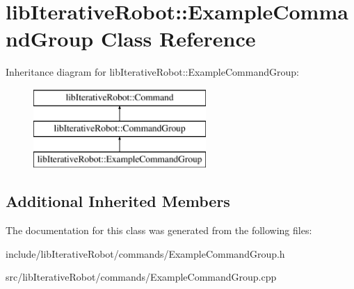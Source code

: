 \hypertarget{classlib_iterative_robot_1_1_example_command_group}{}\section{lib\+Iterative\+Robot\+::Example\+Command\+Group Class Reference}
\label{classlib_iterative_robot_1_1_example_command_group}
Inheritance diagram for lib\+Iterative\+Robot\+::Example\+Command\+Group\+:\begin{figure}[H]
\begin{center}
\leavevmode
\includegraphics[height=3.000000cm]{classlib_iterative_robot_1_1_example_command_group}
\end{center}
\end{figure}
\subsection*{Additional Inherited Members}


The documentation for this class was generated from the following files\+:\begin{DoxyCompactItemize}
\item 
include/lib\+Iterative\+Robot/commands/Example\+Command\+Group.\+h\item 
src/lib\+Iterative\+Robot/commands/Example\+Command\+Group.\+cpp\end{DoxyCompactItemize}
